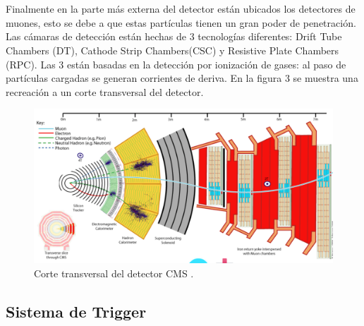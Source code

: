 \\
\\
Finalmente en la parte más externa del detector están ubicados los detectores de muones, esto se debe a que estas partículas tienen un gran poder de penetración. Las cámaras de detección están hechas de 3 tecnologías diferentes: Drift Tube Chambers (DT), Cathode Strip Chambers(CSC) y Resistive Plate Chambers (RPC). Las 3 están basadas en la detección por ionización de gases: al paso de partículas cargadas se generan corrientes de deriva. En la figura 3 se muestra una recreación a un corte transversal del detector.

\begin{figure}
\centering
\includegraphics[width=15cm]{F3.png}
\caption{\label{fig:frog} Corte transversal del detector CMS \cite{Bayatian:2006nff}.}
\end{figure}

\subsection{Sistema de Trigger}

